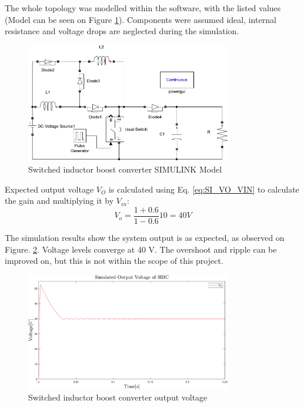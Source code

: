 The whole topology was modelled within the software, with the listed values (Model can be seen on Figure \ref{fig:Model_SI}). Components were assumed ideal, internal resistance and voltage drops are neglected during the simulation. 

\begin{figure} [H]
   \centering
   \includegraphics[width=0.8\textwidth]{figures/bSwitchedInductor/Model_SI.pdf}
    \caption{Switched inductor boost converter SIMULINK Model}
	\label{fig:Model_SI}
\end{figure}

Expected output voltage $V_O$ is calculated using Eq. \ref{eq:SI_VO_VIN} to calculate the gain and multiplying it by $V_{in}$: 
\begin{equation}
	{V_o}= \frac{1+0.6}{1-0.6}10=40V
	\label{eq:Simulation_SI}
\end{equation}

The simulation results show the system output is as expected, as observed on Figure. \ref{fig:Simulation_SI}. Voltage levels converge at 40 V. The overshoot and ripple can be improved on, but this is not within the scope of this project. 


\begin{figure} [H]
   \centering
   \includegraphics[width=0.8\textwidth]{figures/bSwitchedInductor/Simulation_SI.pdf}
    \caption{Switched inductor boost converter output voltage}
	\label{fig:Simulation_SI}
\end{figure}
\vspace{-8mm}